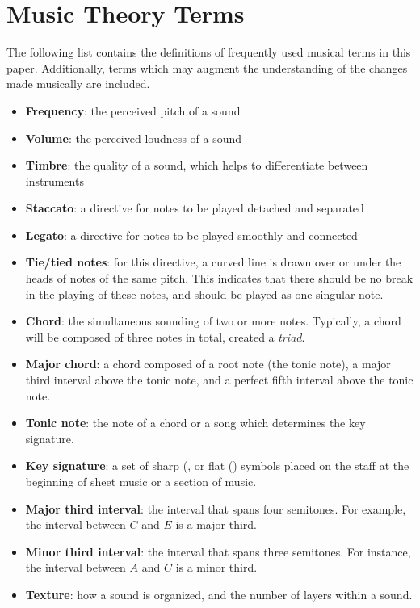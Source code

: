 \chapter{Music Theory Terms}\label{appendix:music-theory-terms}
The following list contains the definitions of frequently used musical terms in this paper. Additionally, terms which may augment the understanding of the changes made musically are included. 
\begin{itemize}
    \item {\textbf{Frequency}: the perceived pitch of a sound}
    \item {\textbf{Volume}: the perceived loudness of a sound}
    \item {\textbf{Timbre}: the quality of a sound, which helps to differentiate between instruments}
    \item {\textbf{Staccato}: a directive for notes to be played detached and separated}
    \item {\textbf{Legato}: a directive for notes to be played smoothly and connected}
    \item {\textbf{Tie/tied notes}: for this directive, a curved line is drawn over or under the heads of notes of the same pitch. This indicates that there should be no break in the playing of these notes, and should be played as one singular note.}
    \item {\textbf{Chord}: the simultaneous sounding of two or more notes. Typically, a chord will be composed of three notes in total, created a \textit{triad}.}
    \item {\textbf{Major chord}: a chord composed of a root note (the tonic note), a major third interval above the tonic note, and a perfect fifth interval above the tonic note.}
    \item {\textbf{Tonic note}: the note of a chord or a song which determines the key signature.}
    \item {\textbf{Key signature}: a set of sharp (\musSharp{}, or flat (\musFlat{}) symbols placed on the staff at the beginning of sheet music or a section of music.}
    \item {\textbf{Major third interval}: the interval that spans four semitones. For example, the interval between $C$ and $E$ is a major third.}
    \item {\textbf{Minor third interval}: the interval that spans three semitones. For instance, the interval between $A$ and $C$ is a minor third.}
    \item {\textbf{Texture}: how a sound is organized, and the number of layers within a sound.}

\end{itemize}

